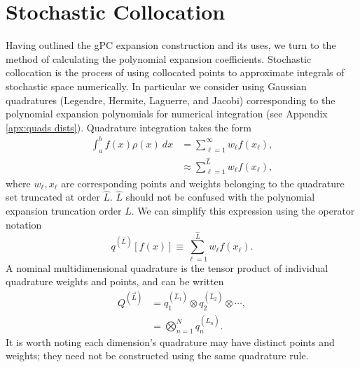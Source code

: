 \section{Stochastic Collocation}\label{sec:stoch coll}
Having outlined the gPC expansion construction and its uses, we turn to the method of calculating the polynomial
expansion coefficients.  Stochastic collocation is the process of using collocated points to approximate integrals 
of stochastic space
numerically.  In particular we consider using Gaussian quadratures (Legendre, Hermite, Laguerre, and Jacobi)
corresponding to the polynomial expansion polynomials for numerical integration (see Appendix \ref{apx:quads
dists}).  Quadrature integration takes
the form
\begin{align}
  \int_a^b f(x)\rho(x)\ dx &= \sum_{\ell=1}^\infty w_\ell f(x_\ell),\\
  &\approx \sum_{\ell=1}^{\hat L} w_\ell f(x_\ell),
\end{align}
where $w_\ell,x_\ell$ are corresponding points and weights belonging to the quadrature set truncated at order
$\hat L$.  $\hat L$ should not be confused with the polynomial expansion truncation order $L$.  We
can simplify this expression using the operator notation
\begin{equation}\label{eq:quad op}
  q^{(\hat L)}[f(x)] \equiv \sum_{\ell=1}^{\hat L} w_\ell f(x_\ell).
\end{equation}
A nominal multidimensional quadrature is the tensor product of
individual quadrature weights and points, and can be written
\begin{align}
  Q^{(\vec{L})} &= q^{(\hat L_1)}_1 \otimes q^{(\hat L_2)}_2 \otimes \cdots,\\
                     &= \bigotimes_{n=1}^N q^{(\hat L_n)}_n.
\end{align}
It is worth noting each dimension's quadrature may have distinct points and weights; they need not be constructed using
the same quadrature rule.

